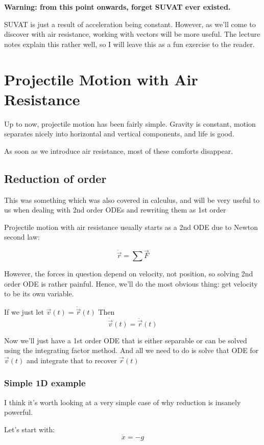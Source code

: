 \textbf{Warning: from this point onwards, forget SUVAT ever existed.} 

SUVAT is just a result of acceleration being constant. However, as we'll come to discover with air resistance, working with vectors will be more useful. The lecture notes explain this rather well, so I will leave this as a fun exercise to the reader. 


\section{Projectile Motion with Air Resistance}

Up to now, projectile motion has been fairly simple. Gravity is constant, motion separates nicely into horizontal and vertical components, and life is good. 

As soon as we introduce air resistance, most of these comforts disappear. 


\subsection{Reduction of order}

This was something which was also covered in calculus, and will be very useful to us when dealing with 2nd order ODEs and rewriting them as 1st order 

Projectile motion with air resistance usually starts as a 2nd ODE due to Newton second law: 

$$
\ddot{\vec{r}} = \sum \vec{F}
$$

However, the forces in question depend on velocity, not position, so solving 2nd order ODE is rather painful. Hence, we'll do the most obvious thing: get velocity to be its own variable. 

If we just let $\vec{v}(t) = \dot{\vec{r}}(t)$ 
Then 
$$
\dot{\vec{v}}(t) = \ddot{\vec{r}}(t)
$$

Now we'll just have a 1st order ODE that is either separable or can be solved using the integrating factor method. And all we need to do is solve that ODE for $\vec{v}(t)$ and integrate that to recover $\vec{r}(t)$

\subsubsection{Simple 1D example}

I think it's worth looking at a very simple case of why reduction is insanely powerful. 

Let's start with: 
$$
\ddot{x} = -g 
$$

